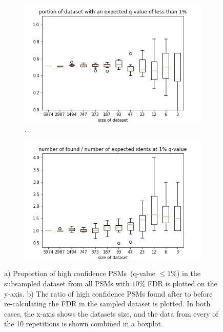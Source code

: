 \begin{figure}
	\normalsize
	\centering
	
\end{figure}
\begin{figure}
	\normalsize
	\centering	
	\begin{subfigure}{0.49 \textwidth}
		\includegraphics[width = \textwidth]{figures/expected.png}
		\caption[Portion of the dataset with high-confidence PSMs]{.}
		\label{fig:results:small_dataset_snd_expected}
	\end{subfigure}
	\hfill
	\begin{subfigure}{0.49 \textwidth}
		\includegraphics[width = \textwidth]{figures/found_vs_expected_dxl.png}
		\caption{}
		\label{fig:results:small_dataset_snd_found_dxl}
	\end{subfigure}
	\caption[Effect of splitting on dataset and FDR estimation]{a) Proportion of high confidence PSMs~(q-value $\leq1\%$) in the subsampled dataset from all PSMs with $10\%$ FDR is plotted on the y-axis. b) The ratio of high confidence PSMs found after to before re-calculating the FDR in the sampled dataset is plotted. In both cases, the x-axis shows the datasets size, and the data from every of the 10 repetitions is shown combined in a boxplot.}
	\label{fig:results:small_dataset_snd_found}
\end{figure}

